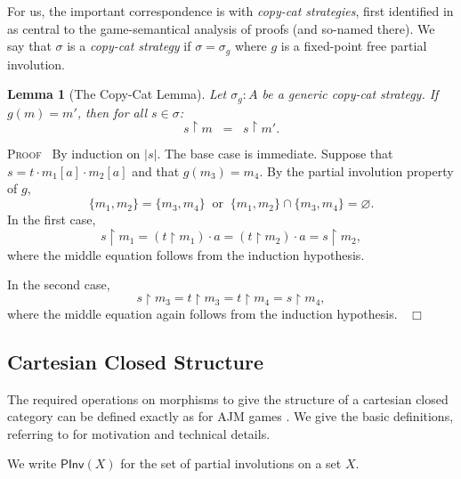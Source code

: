 \documentclass[a4paper,11pt]{article}
\newtheorem{lemma}[proposition]{Lemma}
\newcommand{\restrict}{{\upharpoonright}}
\newcommand{\PInv}[1]{\mathsf{PInv}(#1)}
\newenvironment{proof}{\textsc{Proof}\ }{$\;\; \Box$}
\begin{document}
For us, the important correspondence is with \emph{copy-cat strategies},
first  identified in \cite{AJ94a} as central to the game-semantical
analysis of proofs (and so-named there).
We say that $\sigma$ is a \emph{copy-cat strategy} if $\sigma =
\sigma_g$ where $g$ is a fixed-point free partial involution.

\begin{lemma}[The Copy-Cat Lemma]
Let $\sigma_g : A$ be a generic copy-cat strategy. If $g(m) = m'$, then for all
$s \in \sigma$:
\[ s \restrict m \;\; = \;\; s \restrict m' . \]
\end{lemma}
\begin{proof}
By induction on $|s|$. The base case is immediate.
Suppose that $s = t \cdot m_1[a] \cdot m_2[a]$ and that $g(m_3 ) =
m_4$. By the partial involution property of $g$,
\[ \{ m_1 , m_2 \} = \{ m_3 , m_4 \} \;\; \mbox{or} \;\;  \{ m_1 , m_2 \}
\cap \{ m_3 , m_4 \} = \varnothing . \]
In the first case,
\[ s \restrict m_1 = (t \restrict m_1 )\cdot a  = (t \restrict m_2 )
\cdot a  = s \restrict
m_2 , \]
where the middle equation follows from the induction hypothesis.

\noindent In the second case,
\[ s \restrict m_3 = t \restrict m_3 = t \restrict m_4 = s \restrict
m_4 , \]
where the middle equation again follows from the induction hypothesis.
\end{proof}

\subsection{Cartesian Closed Structure}
The required operations on morphisms to give the structure of a
cartesian closed category can be defined exactly as for AJM games
\cite{AJM00}. We give the basic definitions, referring to
\cite{AJM00} for motivation and technical details.

We write $\PInv{X}$ for the set of partial involutions on a set $X$.
\end{document}

